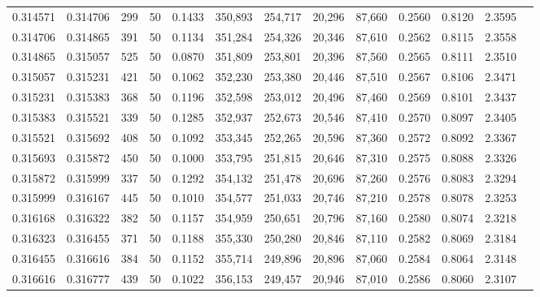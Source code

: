 \begin{tabular}{rrrrrrrrrrrrr}
0.314571 & 0.314706 &   299 &  50 &                                     0.1433 & 350,893 & 254,717 &  20,296 &  87,660 & 0.2560 & 0.8120 & 2.3595 \\
0.314706 & 0.314865 &   391 &  50 &                                     0.1134 & 351,284 & 254,326 &  20,346 &  87,610 & 0.2562 & 0.8115 & 2.3558 \\
0.314865 & 0.315057 &   525 &  50 &                                     0.0870 & 351,809 & 253,801 &  20,396 &  87,560 & 0.2565 & 0.8111 & 2.3510 \\
0.315057 & 0.315231 &   421 &  50 &                                     0.1062 & 352,230 & 253,380 &  20,446 &  87,510 & 0.2567 & 0.8106 & 2.3471 \\
0.315231 & 0.315383 &   368 &  50 &                                     0.1196 & 352,598 & 253,012 &  20,496 &  87,460 & 0.2569 & 0.8101 & 2.3437 \\
0.315383 & 0.315521 &   339 &  50 &                                     0.1285 & 352,937 & 252,673 &  20,546 &  87,410 & 0.2570 & 0.8097 & 2.3405 \\
0.315521 & 0.315692 &   408 &  50 &                                     0.1092 & 353,345 & 252,265 &  20,596 &  87,360 & 0.2572 & 0.8092 & 2.3367 \\
0.315693 & 0.315872 &   450 &  50 &                                     0.1000 & 353,795 & 251,815 &  20,646 &  87,310 & 0.2575 & 0.8088 & 2.3326 \\
0.315872 & 0.315999 &   337 &  50 &                                     0.1292 & 354,132 & 251,478 &  20,696 &  87,260 & 0.2576 & 0.8083 & 2.3294 \\
0.315999 & 0.316167 &   445 &  50 &                                     0.1010 & 354,577 & 251,033 &  20,746 &  87,210 & 0.2578 & 0.8078 & 2.3253 \\
0.316168 & 0.316322 &   382 &  50 &                                     0.1157 & 354,959 & 250,651 &  20,796 &  87,160 & 0.2580 & 0.8074 & 2.3218 \\
0.316323 & 0.316455 &   371 &  50 &                                     0.1188 & 355,330 & 250,280 &  20,846 &  87,110 & 0.2582 & 0.8069 & 2.3184 \\
0.316455 & 0.316616 &   384 &  50 &                                     0.1152 & 355,714 & 249,896 &  20,896 &  87,060 & 0.2584 & 0.8064 & 2.3148 \\
0.316616 & 0.316777 &   439 &  50 &                                     0.1022 & 356,153 & 249,457 &  20,946 &  87,010 & 0.2586 & 0.8060 & 2.3107 \\

\end{tabular}
